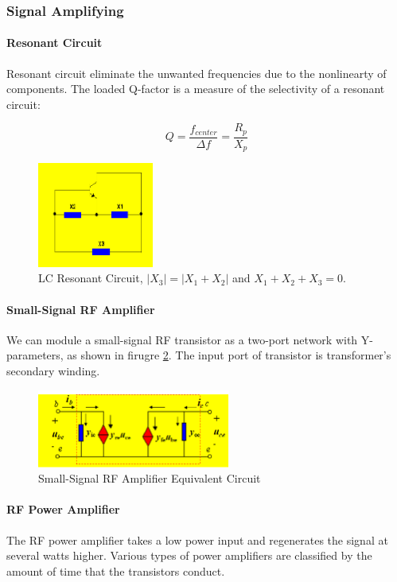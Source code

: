 \subsubsection{Signal Amplifying}

\paragraph{Resonant Circuit} Resonant circuit eliminate the unwanted frequencies due to the nonlinearty of components. The loaded Q-factor is a measure of the selectivity of a resonant circuit:

$$Q=\frac{f_{center}}{\Delta f}=\frac{R_p}{X_p}$$

\begin{figure}
  \centering
  \includegraphics[width=1.5in]{fig/fig_LC_resonant.png}
  \caption{LC Resonant Circuit, $|X_3|=|X_1+X_2|$ and $X_1+X_2+X_3=0$.}\label{fig_lc_resonant}
\end{figure}

\paragraph{Small-Signal RF Amplifier} We can module a small-signal RF transistor as a two-port network with Y-parameters, as shown in firugre \ref{fig_rf_signal_amp}. The input port of transistor is transformer's secondary winding.

\begin{figure}
  \centering
  \includegraphics[width=2.5in]{fig/fig_rf_signal_amp.png}
  \caption{Small-Signal RF Amplifier Equivalent Circuit}\label{fig_rf_signal_amp}
\end{figure}

\paragraph{RF Power Amplifier} The RF power amplifier takes a low power input and regenerates the signal at several watts higher. Various types of power amplifiers are classified by the amount of time that the transistors conduct.

